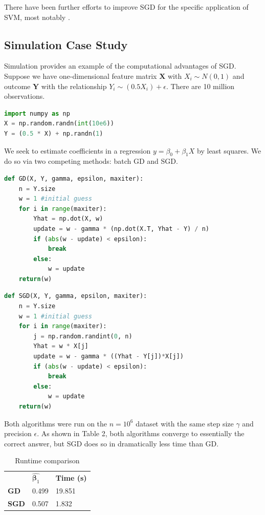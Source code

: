 \documentclass{article}
\begin{document}
There have been further efforts to improve SGD for the specific application of
SVM, most notably \cite{shalev2011pegasos}.

\subsection{Simulation Case Study}

Simulation provides an example of the computational advantages of SGD. 
Suppose we have one-dimensional feature matrix $\bm{X}$ with $X_i \sim N(0, 1)$ 
and outcome $\bm{Y}$ with the
relationship $Y_i \sim (0.5 X_i) + \epsilon$. There are 10 million observations.

\begin{lstlisting}[language=Python]
import numpy as np
X = np.random.randn(int(10e6))
Y = (0.5 * X) + np.randn(1)
\end{lstlisting}

We seek to estimate coefficients in a regression $y = \beta_0 + \beta_1 X$ by least
squares. We do so via two competing methods: batch GD and SGD.

\begin{lstlisting}[language=Python]
def GD(X, Y, gamma, epsilon, maxiter):
	n = Y.size
	w = 1 #initial guess
	for i in range(maxiter):
		Yhat = np.dot(X, w)
		update = w - gamma * (np.dot(X.T, Yhat - Y) / n)
		if (abs(w - update) < epsilon): 
			break
		else:
			w = update
	return(w)
\end{lstlisting}
\begin{lstlisting}[language=Python]
def SGD(X, Y, gamma, epsilon, maxiter):
	n = Y.size
	w = 1 #initial guess
	for i in range(maxiter):
		j = np.random.randint(0, n)
		Yhat = w * X[j]
		update = w - gamma * ((Yhat - Y[j])*X[j])
		if (abs(w - update) < epsilon):
			break
		else:
			w = update
	return(w)
\end{lstlisting}

Both algorithms were run on the $n=10^6$ dataset with the same step size
$\gamma$ and precision $\epsilon$. As shown in Table 2, both algorithms 
converge to essentially the correct answer, but SGD does so in dramatically less time than GD. 

\begin{table}[h!]
	\centering
	\caption{Runtime comparison}
	\begin{tabular}{|l l l|}
		\hline
		& $\hat{\bm{\beta}_1}$ & \textbf{Time (s)} \\
		\textbf{GD} & 0.499 & 19.851 \\
		\textbf{SGD} & 0.507 & 1.832 \\
		\hline
	\end{tabular}
\end{table}
\end{document}
